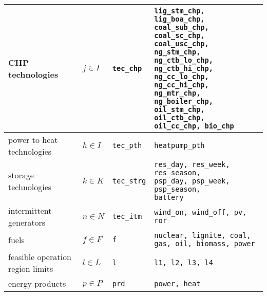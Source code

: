 \documentclass[11pt,a4paper]{article}
\begin{document}
\begin{tabular}{l l l l}
CHP technologies & $j \in I$ & \texttt{tec\_chp} & \makecell[l]{
	\texttt{lig\_stm\_chp, lig\_boa\_chp,}\\
	\texttt{coal\_sub\_chp, coal\_sc\_chp,}\\
	\texttt{coal\_usc\_chp, ng\_stm\_chp,}\\ 
	\texttt{ng\_ctb\_lo\_chp, ng\_ctb\_hi\_chp,}\\
	\texttt{ng\_cc\_lo\_chp, ng\_cc\_hi\_chp,}\\
	\texttt{ng\_mtr\_chp, ng\_boiler\_chp,}\\
	\texttt{oil\_stm\_chp, oil\_ctb\_chp,} \\ 
	\texttt{oil\_cc\_chp, bio\_chp} } \\ \hline

\makecell[l]{power to heat \\ technologies} & $h \in I$ & \texttt{tec\_pth} & \texttt{heatpump\_pth}  \\ \hline

storage technologies & $k \in K$ & \texttt{tec\_strg} & \makecell[l]{
	\texttt{res\_day, res\_week, res\_season,} \\ 
	\texttt{psp\_day, psp\_week, psp\_season,} \\
	\texttt{battery}
	} \\ \hline

\makecell[l]{intermittent \\generators} & $n \in N$ & \texttt{tec\_itm} & \texttt{wind\_on, wind\_off, pv, ror}\\ \hline

fuels & $f \in F$ & \texttt{f} & \makecell[l]{\texttt{nuclear, lignite, coal,} \\ \texttt{gas, oil, biomass, power}} \\ \hline

\makecell[l]{feasible operation \\region limits}& $l \in L$ & \texttt{l} & \texttt{l1, l2, l3, l4} \\ \hline

energy products & $p \in P$ & \texttt{prd} & \texttt{power, heat} \\ \hline \hline
\end{tabular}
\end{document}
